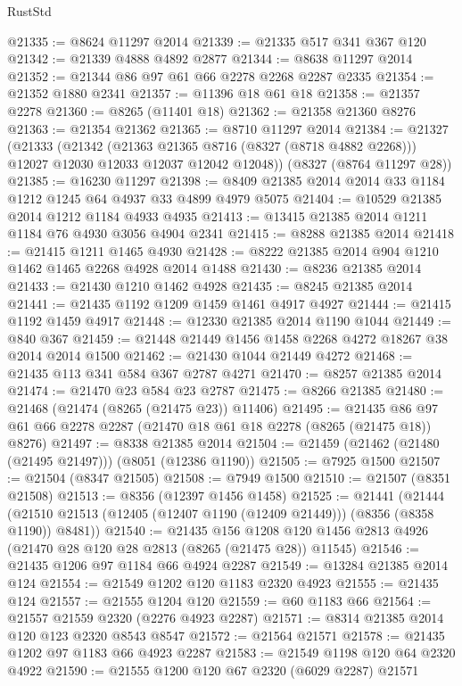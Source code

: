 \begin{lexlean}{RustStd}
\begin{coremodule}
@21335 := @8624 @11297 @2014
@21339 := @21335 @517 @341 @367 @120
@21342 := @21339 @4888 @4892 @2877
@21344 := @8638 @11297 @2014
@21352 := @21344 @86 @97 @61 @66 @2278 @2268 @2287 @2335
@21354 := @21352 @1880 @2341
@21357 := @11396 @18 @61 @18
@21358 := @21357 @2278
@21360 := @8265 (@11401 @18)
@21362 := @21358 @21360 @8276
@21363 := @21354 @21362
@21365 := @8710 @11297 @2014
@21384 := @21327
    (@21333
      (@21342
        (@21363 @21365 @8716 (@8327 (@8718 @4882 @2268)))
        @12027
        @12030
        @12033
        @12037
        @12042
        @12048))
    (@8327 (@8764 @11297 @28))
@21385 := @16230 @11297
@21398 := @8409 @21385 @2014 @2014 @33 @1184 @1212 @1245 @64 @4937 @33 @4899 @4979 @5075
@21404 := @10529 @21385 @2014 @1212 @1184 @4933 @4935
@21413 := @13415 @21385 @2014 @1211 @1184 @76 @4930 @3056 @4904 @2341
@21415 := @8288 @21385 @2014
@21418 := @21415 @1211 @1465 @4930
@21428 := @8222 @21385 @2014 @904 @1210 @1462 @1465 @2268 @4928 @2014 @1488
@21430 := @8236 @21385 @2014
@21433 := @21430 @1210 @1462 @4928
@21435 := @8245 @21385 @2014
@21441 := @21435 @1192 @1209 @1459 @1461 @4917 @4927
@21444 := @21415 @1192 @1459 @4917
@21448 := @12330 @21385 @2014 @1190 @1044
@21449 := @840 @367
@21459 := @21448 @21449 @1456 @1458 @2268 @4272 @18267 @38 @2014 @2014 @1500
@21462 := @21430 @1044 @21449 @4272
@21468 := @21435 @113 @341 @584 @367 @2787 @4271
@21470 := @8257 @21385 @2014
@21474 := @21470 @23 @584 @23 @2787
@21475 := @8266 @21385
@21480 := @21468 (@21474 (@8265 (@21475 @23)) @11406)
@21495 := @21435 @86 @97 @61 @66 @2278 @2287 (@21470 @18 @61 @18 @2278 (@8265 (@21475 @18)) @8276)
@21497 := @8338 @21385 @2014
@21504 := @21459 (@21462 (@21480 (@21495 @21497))) (@8051 (@12386 @1190))
@21505 := @7925 @1500
@21507 := @21504 (@8347 @21505)
@21508 := @7949 @1500
@21510 := @21507 (@8351 @21508)
@21513 := @8356 (@12397 @1456 @1458)
@21525 := @21441
    (@21444 (@21510 @21513 (@12405 (@12407 @1190 (@12409 @21449))) (@8356 (@8358 @1190)) @8481))
@21540 := @21435
    @156
    @1208
    @120
    @1456
    @2813
    @4926
    (@21470 @28 @120 @28 @2813 (@8265 (@21475 @28)) @11545)
@21546 := @21435 @1206 @97 @1184 @66 @4924 @2287
@21549 := @13284 @21385 @2014 @124
@21554 := @21549 @1202 @120 @1183 @2320 @4923
@21555 := @21435 @124
@21557 := @21555 @1204 @120
@21559 := @60 @1183 @66
@21564 := @21557 @21559 @2320 (@2276 @4923 @2287)
@21571 := @8314 @21385 @2014 @120 @123 @2320 @8543 @8547
@21572 := @21564 @21571
@21578 := @21435 @1202 @97 @1183 @66 @4923 @2287
@21583 := @21549 @1198 @120 @64 @2320 @4922
@21590 := @21555 @1200 @120 @67 @2320 (@6029 @2287) @21571

\end{coremodule}
\end{lexlean}
